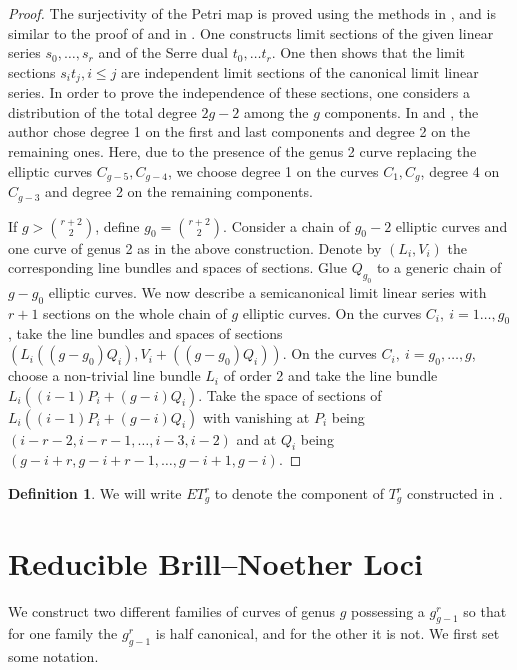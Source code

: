 \documentclass[11pt]{amsart}
\theoremstyle{definition}
\newtheorem{defn}[theorem]{Definition}
\theoremstyle{definition}
\begin{document}
\begin{proof}
The surjectivity of the Petri map is proved using the methods in \cite{LOTZ1}, \cite{LOTZ2} and is similar to the proof of \cite[Proposition~1.8]{Ramif} and in \cite[Theorem~2.1]{DBN}. 
One constructs limit sections of the given linear series $s_0,\dots, s_r$ and of the Serre dual $t_0,\dots t_r$. 
One then shows that the limit sections $s_it_j, i\le j$ are independent limit sections of the canonical limit linear series.
In order to prove the independence of these sections, one considers a distribution of the total degree $2g-2$ among the $g$ components. 
In  \cite{Ramif} and \cite{DBN}, the author chose degree 1 on the first and last components and degree 2 on the remaining ones.
Here, due to the presence of the genus 2 curve replacing the elliptic curves $C_{g-5},C_{g-4}$, we choose degree 1 on the curves $C_1, C_g$, 
degree 4 on $C_{g-3}$  and degree 2 on the remaining components. 

\medskip

If  $g> {r+2\choose 2}$, define $g_0=  {r+2\choose 2}$. Consider a chain of $g_0-2$ elliptic curves and one curve of genus 2 as in the above construction.
Denote by $(L_i, V_i)$ the corresponding line bundles and spaces of sections.
Glue $Q_{g_0}$ to a generic chain of $g-g_0$ elliptic curves. 
We now describe a semicanonical limit linear series with $r+1$ sections on the whole chain of $g$ elliptic curves. 
On the curves $C_i,\ i=1\dots, g_0$, take the line bundles and spaces of sections $(L_i((g-g_0)Q_i), V_i +((g-g_0)Q_i))$.
On the curves $C_i,\ i= g_0, \dots,g$, choose a non-trivial line bundle  $L_i$  of order 2 and take the line bundle $L_i(( i-1)P_i+(g-i)Q_i)$.
Take the space of sections of $L_i(( i-1)P_i+(g-i)Q_i)$ with vanishing at $P_i$ being $(i-r-2,  i-r-1,\dots, i-3, i-2)$ and at $Q_i$ being $(g-i+r,  g-i+r-1,\dots, g-i+1, g-i)$.
\end{proof}

\begin{defn}
	We will write $ET^r_g$ to denote the component of $T^r_g$ constructed in .
\end{defn}





\section{Reducible Brill--Noether Loci}

We construct two different families of curves of genus $g$ possessing a $g^r_{g-1}$ so that for one family the $g^r_{g-1}$ is half canonical, and for the other it is not. We first set some notation.
\end{document}
